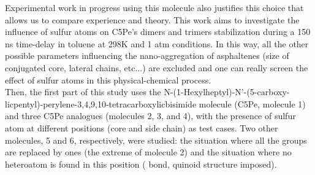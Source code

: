 Experimental work in progress using this molecule also justifies this choice that allows us to compare experience and theory. This work aims to investigate the influence of sulfur atoms on C5Pe's dimers and trimers stabilization during a 150 ns time-delay in toluene at 298K and 1 atm conditions. In this way, all the other possible parameters influencing the nano-aggregation of asphaltenes (size of conjugated core, lateral chains, etc...) are excluded and one can really screen the effect of sulfur atoms in this physical-chemical process.\\

Then, the first part of this study uses the N-(1-Hexylheptyl)-N'-(5-carboxy-licpentyl)-perylene-3,4,9,10-tetracarboxylicbisimide molecule (C5Pe, molecule 1) and three C5Pe analogues (molecules 2, 3, and 4), with the presence of sulfur atom at different positions (core and side chain) as test cases. Two other molecules, 5 and 6, respectively, were studied: the situation where all the  groups are replaced by  ones (the extreme of molecule 2) and the situation where no heteroatom is found in this position ( bond, quinoid structure imposed). 

